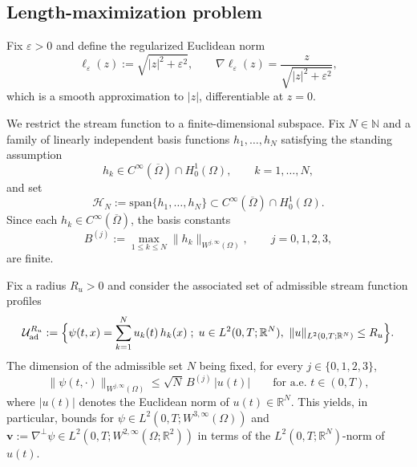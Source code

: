 \documentclass[12pt, reqno]{amsart}
\theoremstyle{plain}
\theoremstyle{definition}
\numberwithin{equation}{section}
\numberwithin{figure}{section}
\numberwithin{algorithm}{section}
\begin{document}
\subsection{Length-maximization problem}

Fix $\varepsilon>0$ and define the regularized Euclidean norm
\begin{equation}\label{eq:ell}
\ell_\varepsilon(z):=\sqrt{|z|^2+\varepsilon^2},
\qquad
\nabla \ell_\varepsilon(z)=\frac{z}{\sqrt{|z|^2+\varepsilon^2}},
\end{equation}
which is a smooth approximation to $|z|$, differentiable at $z=0$.

We restrict the stream function to a finite-dimensional subspace. Fix $N\in\mathbb N$ and a family of linearly independent basis functions $h_1,\dots,h_N$ satisfying the standing assumption
\begin{equation}\label{eq:basis_assumption}
h_k\in C^\infty(\overline\Omega)\cap H_0^1(\Omega),\qquad k=1,\dots,N,
\end{equation}
and set
\begin{equation}\label{eq:smooth_space}
\mathcal H_N:=\mathrm{span}\{h_1,\dots,h_N\}\subset C^\infty(\overline\Omega)\cap H_0^1(\Omega).
\end{equation}
Since each $h_k\in C^\infty(\overline\Omega)$, the basis constants
\begin{equation}\label{eq:basis_constants}
B^{(j)}:=\max_{1\le k\le N}\|h_k\|_{W^{j,\infty}(\Omega)},\qquad j=0,1,2,3,
\end{equation}
are finite.

Fix a radius $R_u>0$ and consider the associated set of admissible stream function profiles
\begin{equation}\label{eq:Uad}
\mathcal U_{\mathrm{ad}}^{R_u}
:=
\Bigl\{
\psi(t,x)=\sum_{k=1}^N u_k(t)\,h_k(x)\;;\;u\in L^2(0,T;\mathbb R^N),\ \|u\|_{L^2(0,T;\mathbb R^N)}\le R_u
\Bigr\}.
\end{equation}
The dimension of the admissible set $N$ being fixed, for every $j\in\{0,1,2,3\}$,
\begin{equation}\label{eq:pt_bound}
\|\psi(t,\cdot)\|_{W^{j,\infty}(\Omega)}\le\sqrt N\,B^{(j)}\,|u(t)|\qquad\text{for a.e. }t\in(0,T),
\end{equation}
where $|u(t)|$ denotes the Euclidean norm of $u(t)\in\mathbb R^N$. This yields, in particular, bounds for $\psi\in L^2(0,T;W^{3,\infty}(\Omega))$ and $\mathbf v:=\nabla^\perp\psi\in L^2(0,T;W^{2,\infty}(\Omega;\mathbb R^2))$ in terms of the $L^2(0,T;\mathbb R^N)$-norm of $u(t).$
\end{document}
